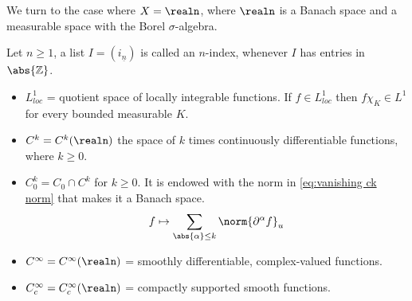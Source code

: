 \documentclass[../main-v2-manifolds.tex]{subfiles}
\begin{document}
We turn to the case where $X=\realn$, where $\realn$ is a Banach space and a measurable space with the Borel $\sigma$-algebra.
\begin{definition}
    Let $n\geq 1$, a list $I=(i_{\underline{n}})$ is called an $n$-index, whenever $I$ has entries in $\abs{\mathbb{Z}}$.
\end{definition}
\begin{itemize}
    \item $L^1_{loc}$ = quotient space of locally integrable functions. If $f\in L^1_{loc}$ then $f\chi_K\in L^1$ for every bounded measurable $K$.
    \item $C^k = C^k(\realn)$ the space of $k$ times continuously differentiable functions, where $k\geq 0$.
    \item $C_0^k = C_0\cap C^k$ for $k\geq 0$. It is endowed with the norm in \cref{eq:vanishing ck norm} that makes it a Banach space.
    \begin{equation}
        f\mapsto \sum_{\abs{\alpha}\leq k}\norm{\partial^\alpha f}_u
        \label{eq:vanishing ck norm}
    \end{equation}
    \item $C^\infty=C^\infty(\realn)$ = smoothly differentiable, complex-valued functions.
    \item $C^\infty_c=C^\infty_c(\realn)$ = compactly supported smooth functions.
\end{itemize}
\end{document}
